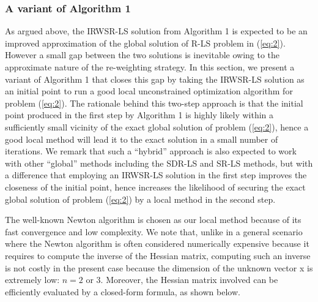 \subsubsection{A variant of Algorithm 1}%

As argued above, the IRWSR-LS solution from Algorithm 1 is expected to be an improved approximation of the global solution of R-LS problem in (\ref{eq:2}). However a small gap between the two solutions is inevitable owing to the approximate nature of the re-weighting strategy. In this section, we present a variant of Algorithm 1 that closes this gap by taking the IRWSR-LS solution as an initial point to run a good local unconstrained optimization algorithm for problem (\ref{eq:2}).  The rationale behind this two-step approach is that the initial point produced in the first step by Algorithm 1 is highly likely within a sufficiently small vicinity of the exact global solution of problem (\ref{eq:2}), hence a good local method will lead it to the exact solution in a small number of iterations. We remark that such a ``hybrid'' approach is also expected to work with other ``global'' methods including the SDR-LS and SR-LS methods, but with a difference that employing an IRWSR-LS solution in the first step improves the closeness of the initial point, hence increases the likelihood of securing the exact global solution of problem (\ref{eq:2}) by a local method in the second step.

The well-known Newton algorithm \cite{AntonLu} is chosen as our local method because of its fast convergence and low complexity. We note that, unlike in a general scenario where the Newton algorithm is often considered numerically expensive because it requires to compute the inverse of the Hessian matrix, computing such an inverse is not costly in the present case because the dimension of the unknown vector x is extremely low: $n = 2$ or 3. Moreover, the Hessian matrix involved can be efficiently evaluated by a closed-form formula, as shown below.

